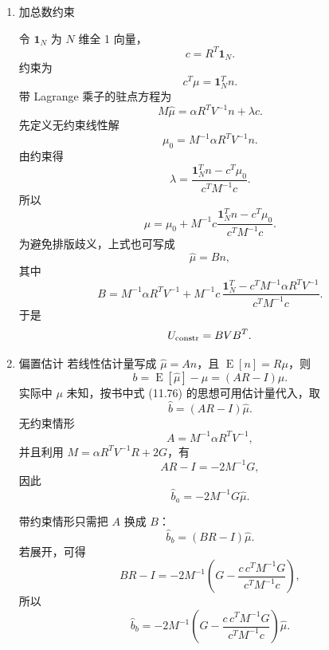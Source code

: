 \begin{question}
\begin{solution}
\begin{enumerate}
\item 加总数约束

令 \(\mathbf 1_N\) 为 \(N\) 维全 1 向量，
\[
c=R^T\mathbf 1_N.
\]
约束为
\[
c^T\mu=\mathbf 1_N^Tn.
\]
带 Lagrange 乘子的驻点方程为
\[
M\hat\mu=\alpha R^TV^{-1}n+\lambda c.
\]
先定义无约束线性解
\[
\mu_0=M^{-1}\alpha R^TV^{-1}n.
\]
由约束得
\[
\lambda=
\frac{\mathbf 1_N^Tn-c^T\mu_0}{c^TM^{-1}c}.
\]
所以
\[
\hat\mu
=\mu_0+M^{-1}c\frac{\mathbf 1_N^Tn-c^T\mu_0}{c^TM^{-1}c}.
\]
为避免排版歧义，上式也可写成
\[
\hat\mu=Bn,
\]
其中
\[
B=M^{-1}\alpha R^TV^{-1}
+M^{-1}c\,
\frac{\mathbf 1_N^T-c^TM^{-1}\alpha R^TV^{-1}}{c^TM^{-1}c}.
\]
于是
\[
U_{\rm constr}=BVB^T.
\]

\item 偏置估计
若线性估计量写成 \(\hat\mu=An\)，且 \(\operatorname{E}[n]=R\mu\)，则
\[
b=\operatorname{E}[\hat\mu]-\mu=(AR-I)\mu.
\]
实际中 \(\mu\) 未知，按书中式 (11.76) 的思想可用估计量代入，取
\[
\hat b=(AR-I)\hat\mu.
\]
无约束情形
\[
A=M^{-1}\alpha R^TV^{-1},
\]
并且利用 \(M=\alpha R^TV^{-1}R+2G\)，有
\[
AR-I=-2M^{-1}G,
\]
因此
\[
\hat b_a=-2M^{-1}G\hat\mu.
\]

带约束情形只需把 \(A\) 换成 \(B\)：
\[
\hat b_b=(BR-I)\hat\mu.
\]
若展开，可得
\[
BR-I=-2M^{-1}
\left(
G-\frac{c\,c^TM^{-1}G}{c^TM^{-1}c}
\right),
\]
所以
\[
\hat b_b=-2M^{-1}
\left(
G-\frac{c\,c^TM^{-1}G}{c^TM^{-1}c}
\right)\hat\mu.
\]
\end{enumerate}
\end{solution}
\end{question}

